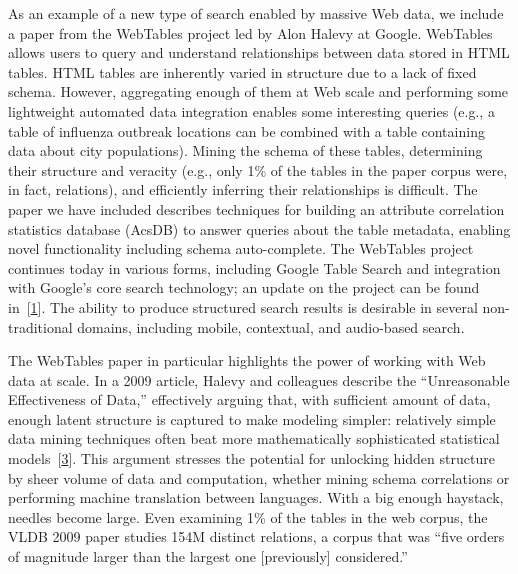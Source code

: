 \documentclass[b5paper,11pt,twoside,openright]{book}
\begin{document}
As an example of a new type of search enabled by massive Web data, we
include a paper from the WebTables project led by Alon Halevy at Google.
WebTables allows users to query and understand relationships between
data stored in HTML tables. HTML tables are inherently varied in
structure due to a lack of fixed schema. However, aggregating enough of
them at Web scale and performing some lightweight automated data
integration enables some interesting queries (e.g., a table of influenza
outbreak locations can be combined with a table containing data about
city populations). Mining the schema of these tables, determining their
structure and veracity (e.g., only 1\% of the tables in the paper corpus
were, in fact, relations), and efficiently inferring their relationships
is difficult. The paper we have included describes techniques for
building an attribute correlation statistics database (AcsDB) to answer
queries about the table metadata, enabling novel functionality including
schema auto-complete. The WebTables project continues today in various
forms, including Google Table Search and integration with Google's core
search technology; an update on the project can be found
in~{{[}\protect\hyperlink{ref-webtables-update}{1}{]}}. The ability to
produce structured search results is desirable in several
non-traditional domains, including mobile, contextual, and audio-based
search.

The WebTables paper in particular highlights the power of working with
Web data at scale. In a 2009 article, Halevy and colleagues describe the
``Unreasonable Effectiveness of Data,'' effectively arguing that, with
sufficient amount of data, enough latent structure is captured to make
modeling simpler: relatively simple data mining techniques often beat
more mathematically sophisticated statistical
models~{{[}\protect\hyperlink{ref-unreasonable-data}{3}{]}}. This
argument stresses the potential for unlocking hidden structure by sheer
volume of data and computation, whether mining schema correlations or
performing machine translation between languages. With a big enough
haystack, needles become large. Even examining 1\% of the tables in the
web corpus, the VLDB 2009 paper studies 154M distinct relations, a
corpus that was ``five orders of magnitude larger than the largest one
{[}previously{]} considered.''
\end{document}
